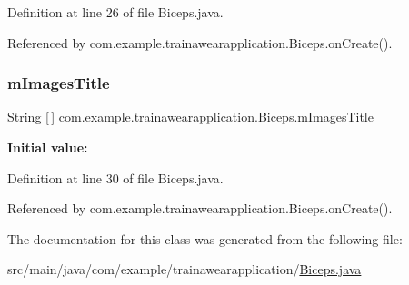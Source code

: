 Definition at line 26 of file Biceps.\+java.



Referenced by com.\+example.\+trainawearapplication.\+Biceps.\+on\+Create().

\mbox{\label{classcom_1_1example_1_1trainawearapplication_1_1_biceps_acc5fba9ec43f042ed263e515defce14e}} 
\subsubsection{\texorpdfstring{mImagesTitle}{mImagesTitle}}
{\footnotesize\ttfamily String \mbox{[}$\,$\mbox{]} com.\+example.\+trainawearapplication.\+Biceps.\+m\+Images\+Title\hspace{0.3cm}{\ttfamily [private]}}

{\bfseries Initial value\+:}
\begin{DoxyCode}{0}
\DoxyCodeLine{            \textcolor{stringliteral}{"Pullup1"}, \textcolor{stringliteral}{"Pullup2"}, \textcolor{stringliteral}{"Pullup3"}}
\DoxyCodeLine{    \}}

\end{DoxyCode}


Definition at line 30 of file Biceps.\+java.



Referenced by com.\+example.\+trainawearapplication.\+Biceps.\+on\+Create().



The documentation for this class was generated from the following file\+:\begin{DoxyCompactItemize}
\item 
src/main/java/com/example/trainawearapplication/\mbox{\hyperlink{_biceps_8java}{Biceps.\+java}}\end{DoxyCompactItemize}
